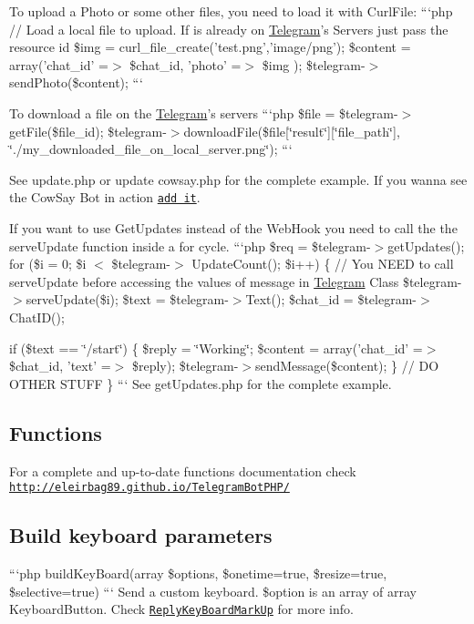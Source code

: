 To upload a Photo or some other files, you need to load it with Curl\-File\-: ```php // Load a local file to upload. If is already on \hyperlink{class_telegram}{Telegram}'s Servers just pass the resource id \$img = curl\-\_\-file\-\_\-create('test.\-png','image/png'); \$content = array('chat\-\_\-id' =$>$ \$chat\-\_\-id, 'photo' =$>$ \$img ); \$telegram-\/$>$send\-Photo(\$content); ```

To download a file on the \hyperlink{class_telegram}{Telegram}'s servers ```php \$file = \$telegram-\/$>$get\-File(\$file\-\_\-id); \$telegram-\/$>$download\-File(\$file\mbox{[}\char`\"{}result\char`\"{}\mbox{]}\mbox{[}\char`\"{}file\-\_\-path\char`\"{}\mbox{]}, \char`\"{}./my\-\_\-downloaded\-\_\-file\-\_\-on\-\_\-local\-\_\-server.\-png\char`\"{}); ```

See update.\-php or update cowsay.\-php for the complete example. If you wanna see the Cow\-Say Bot in action \href{https://telegram.me/cowmooobot}{\tt add it}.

If you want to use Get\-Updates instead of the Web\-Hook you need to call the the serve\-Update function inside a for cycle. ```php \$req = \$telegram-\/$>$get\-Updates(); for (\$i = 0; \$i $<$ \$telegram-\/$>$ Update\-Count(); \$i++) \{ // You N\-E\-E\-D to call serve\-Update before accessing the values of message in \hyperlink{class_telegram}{Telegram} Class \$telegram-\/$>$serve\-Update(\$i); \$text = \$telegram-\/$>$Text(); \$chat\-\_\-id = \$telegram-\/$>$Chat\-I\-D();

if (\$text == \char`\"{}/start\char`\"{}) \{ \$reply = \char`\"{}\-Working\char`\"{}; \$content = array('chat\-\_\-id' =$>$ \$chat\-\_\-id, 'text' =$>$ \$reply); \$telegram-\/$>$send\-Message(\$content); \} // D\-O O\-T\-H\-E\-R S\-T\-U\-F\-F \} ``` See get\-Updates.\-php for the complete example.

\subsection*{Functions }

For a complete and up-\/to-\/date functions documentation check \href{http://eleirbag89.github.io/TelegramBotPHP/}{\tt http\-://eleirbag89.\-github.\-io/\-Telegram\-Bot\-P\-H\-P/}

\subsection*{Build keyboard parameters }

```php build\-Key\-Board(array \$options, \$onetime=true, \$resize=true, \$selective=true) ``` Send a custom keyboard. \$option is an array of array Keyboard\-Button. Check \href{https://core.telegram.org/bots/api#replykeyboardmarkup}{\tt Reply\-Key\-Board\-Mark\-Up} for more info.

